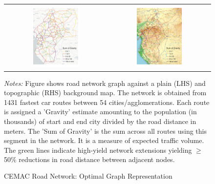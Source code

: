 \documentclass[a4paper]{article}
\begin{document}
\begin{figure}[H] 
\centering
\caption{\label{fig:ROADS} CEMAC Road Network: Optimal Graph Representation}
\begin{tabular}{cc}
\includegraphics[width=0.48\textwidth]{"../figures/trans_CEMAC_network_actual_discretized_gravity_new_roads_real_edges.pdf"} &
\includegraphics[width=0.48\textwidth]{"../figures/trans_CEMAC_network_actual_discretized_gravity_new_roads_OpenTopoMap.pdf"} \\ [-0.8em]
\end{tabular}
\raggedright
\scriptsize 
\emph{Notes:} Figure shows road network graph against a plain (LHS) and topographic (RHS) background map. The network is obtained from 1431 fastest car routes between 54 cities/agglomerations. Each route is assigned a 'Gravity' estimate amounting to the population (in thousands) of start and end city divided by the road distance in meters. The 'Sum of Gravity' is the sum across all routes using this segment in the network. It is a measure of expected traffic volume. The green lines indicate high-yield network extensions yielding $\geq$50\% reductions in road distance between adjacent nodes. %
\end{figure}
\end{document}
